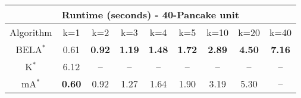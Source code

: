 \begin{tabular}{c|cccccccc}\toprule
\multicolumn{9}{c}{Runtime (seconds) - 40-Pancake unit}\\ \midrule
Algorithm & k=1 & k=2 & k=3 & k=4 & k=5 & k=10 & k=20 & k=40 \\ \midrule
BELA$^*$ & 0.61 & \textbf{0.92} & \textbf{1.19} & \textbf{1.48} & \textbf{1.72} & \textbf{2.89} & \textbf{4.50} & \textbf{7.16} \\
K$^*$ & 6.12 & -- & -- & -- & -- & -- & -- & -- \\
mA$^*$ & \textbf{0.60} & 0.92 & 1.27 & 1.64 & 1.90 & 3.19 & 5.30 & -- \\ \bottomrule 
\end{tabular}
